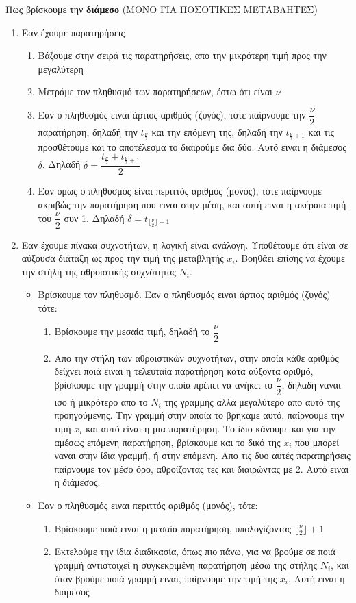 \documentclass[a4paper,12pt]{article}                      %
\begin{document}
Πως βρίσκουμε την \textbf{διάμεσο} (ΜΟΝΟ ΓΙΑ ΠΟΣΟΤΙΚΕΣ ΜΕΤΑΒΛΗΤΕΣ)
\begin{enumerate}
	\item Εαν έχουμε παρατηρήσεις
	\begin{enumerate}
		\item Βάζουμε στην σειρά τις παρατηρήσεις, απο την μικρότερη τιμή προς την μεγαλύτερη
		\item Μετράμε τον πληθυσμό των παρατηρήσεων, έστω ότι είναι $ \nu $
		\item Εαν ο πληθυσμός ειναι άρτιος αριθμός (ζυγός), τότε παίρνουμε την $ \dfrac{\nu}{2} $ παρατήρηση, δηλαδή την $ t_{\frac{\nu}{2}} $ και την επόμενη της, δηλαδή την $ t_{\frac{\nu}{2}+1} $ και τις προσθέτουμε και το αποτέλεσμα το διαιρούμε δια δύο. Αυτό ειναι η διάμεσος $\delta$. Δηλαδή $ \delta=\dfrac{t_{\frac{\nu}{2}}+t_{\frac{\nu}{2}+1}}{2} $
		\item Εαν ομως ο πληθυσμός είναι περιττός αριθμός (μονός), τότε παίρνουμε ακριβώς την παρατήρηση που ειναι στην μέση, και αυτή ειναι η ακέραια τιμή του $ \dfrac{\nu}{2} $ συν 1. Δηλαδή $ \delta = t_{\lfloor \frac{\nu}{2} \rfloor +1} $
	\end{enumerate}
	\item Eαν έχουμε πίνακα συχνοτήτων, η λογική είναι ανάλογη. Υποθέτουμε ότι είναι σε αύξουσα διάταξη ως προς την τιμή της μεταβλητής $ x_i $. Βοηθάει επίσης να έχουμε την στήλη της αθροιστικής συχνότητας $ N_i $. 
	\begin{itemize}
		\item Βρίσκουμε τον πληθυσμό. Εαν ο πληθυσμός ειναι άρτιος αριθμός (ζυγός) τότε:
		\begin{enumerate}
			\item Βρίσκουμε την μεσαία τιμή, δηλαδή το $\dfrac{\nu}{2} $
			\item Απο την στήλη των αθροιστικών συχνοτήτων, στην οποία κάθε αριθμός δείχνει ποιά ειναι η τελευταία παρατήρηση κατα αύξοντα αριθμό, βρίσκουμε την γραμμή στην οποία πρέπει να ανήκει το $\dfrac{\nu}{2} $, δηλαδή ναναι ισο ή μικρότερο απο το $ N_i$ της γραμμής αλλά μεγαλύτερο απο αυτό της προηγούμενης. Την γραμμή στην οποία το βρηκαμε αυτό, παίρνουμε την τιμή $ x_i $ και αυτό είναι η μια παρατήρηση. Το ίδιο κάνουμε και για την αμέσως επόμενη παρατήρηση, βρίσκουμε και το δικό της $x_i$ που μπορεί ναναι στην ίδια γραμμή, ή στην επόμενη. Απο τις δυο αυτές παρατηρήσεις παίρνουμε τον μέσο όρο, αθροίζοντας τες και διαιρώντας με 2. Αυτό ειναι η διάμεσος.
		\end{enumerate}
		\item Εαν ο πληθυσμός ειναι περιττός αριθμός (μονός), τότε:
		\begin{enumerate}
			\item Βρίσκουμε ποιά ειναι η μεσαία παρατήρηση, υπολογίζοντας $\lfloor \frac{\nu}{2} \rfloor +1$
			\item Εκτελούμε την ίδια διαδικασία, όπως πιο πάνω, για να βρούμε σε ποιά γραμμή αντιστοιχεί η συγκεκριμένη παρατήρηση μέσω της στήλης $N_i$, και όταν βρούμε ποιά γραμμή ειναι, παίρνουμε την τιμή της $x_i$. Αυτή ειναι η διάμεσος
		\end{enumerate}
	\end{itemize}
\end{enumerate}
\end{document}

